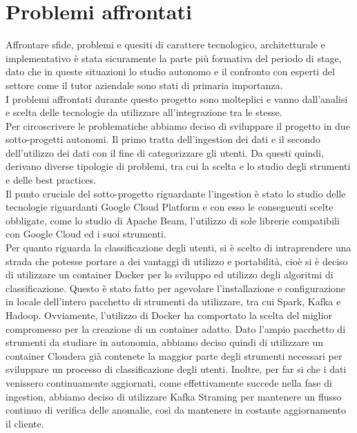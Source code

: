 \section{Problemi affrontati}
Affrontare sfide, problemi e quesiti di carattere tecnologico, architetturale e implementativo è stata sicuramente la parte più formativa del periodo di stage, dato che in queste situazioni lo studio autonomo e il confronto con esperti del settore come il tutor aziendale sono stati di primaria importanza.
\\
I problemi affrontati durante questo progetto sono molteplici e vanno dall'analisi e scelta delle tecnologie da utilizzare all'integrazione tra le stesse.
\\
Per circoscrivere le problematiche abbiamo deciso di sviluppare il progetto in due sotto-progetti autonomi. 
Il primo tratta dell'ingestion dei dati e il secondo dell'utilizzo dei dati con il fine di categorizzare gli utenti. Da questi quindi, derivano diverse tipologie di problemi, tra cui la scelta e lo studio degli strumenti e delle \gls{best practices}.
\\
Il punto cruciale del sotto-progetto riguardante l'ingestion è stato lo studio delle tecnologie riguardanti Google Cloud Platform e con esso le conseguenti scelte obbligate, come lo studio di Apache Beam, l'utilizzo di sole librerie compatibili con Google Cloud ed i suoi strumenti.
\\
Per quanto riguarda la classificazione degli utenti, si è scelto di intraprendere una strada che potesse portare a dei vantaggi di utilizzo e portabilità, cioè si è deciso di utilizzare un \gls{container} Docker per lo sviluppo ed utilizzo degli algoritmi di classificazione.
Questo è stato fatto per agevolare l'installazione e configurazione in locale dell'intero pacchetto di strumenti da utilizzare, tra cui Spark, Kafka e Hadoop.
Ovviamente, l'utilizzo di Docker ha comportato la scelta del miglior compromesso per la creazione di un container adatto. Dato l'ampio pacchetto di strumenti da studiare in autonomia, abbiamo deciso quindi di utilizzare un container Cloudera \cite{containercloudera} già contenete la maggior parte degli strumenti necessari per sviluppare un processo di classificazione degli utenti.
Inoltre, per far si che i dati venissero continuamente aggiornati, come effettivamente succede nella fase di ingestion, abbiamo deciso di utilizzare Kafka Straming per mantenere un flusso continuo di verifica delle anomalie, così da mantenere in costante aggiornamento il cliente.

